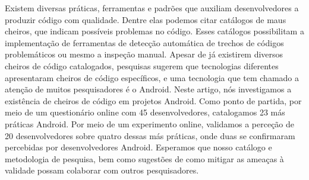 Existem diversas práticas, ferramentas e padrões que auxiliam desenvolvedores a produzir código com qualidade. Dentre elas podemos citar catálogos de maus cheiros, que indicam possíveis problemas no código. Esses catálogos possibilitam a implementação de ferramentas de detecção automática de trechos de códigos problemáticos ou mesmo a inspeção manual. Apesar de já existirem diversos cheiros de código catalogados, pesquisas sugerem que tecnologias diferentes apresentaram cheiros de código específicos, e uma tecnologia que tem chamado a atenção de muitos pesquisadores é o Android. Neste artigo, nós investigamos a existência de cheiros de código em projetos Android. Como ponto de partida, por meio de um questionário online com 45 desenvolvedores, catalogamos 23 más práticas Android. Por meio de um experimento online, validamos a perceção de 20 desenvolvedores sobre quatro dessas más práticas, onde duas se confirmaram percebidas por desenvolvedores Android. Esperamos que nosso catálogo e metodologia de pesquisa, bem como sugestões de como mitigar as ameaças à validade possam colaborar com outros pesquisadores.


